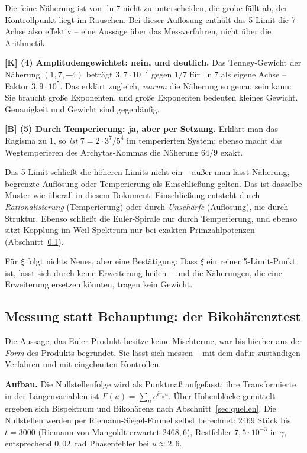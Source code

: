 Die feine N\"aherung ist von $\ln 7$ nicht zu unterscheiden, die grobe
f\"allt ab, der Kontrollpunkt liegt im Rauschen. Bei dieser Aufl\"osung
enth\"alt das 5-Limit die 7-Achse also effektiv -- eine Aussage \"uber
das Messverfahren, nicht \"uber die Arithmetik.

\textbf{[K] (4) Amplitudengewichtet: nein, und deutlich.} Das
Tenney-Gewicht der N\"aherung $(1,7,-4)$ betr\"agt
$3{,}7\cdot10^{-7}$ gegen $1/7$ f\"ur $\ln 7$ als eigene Achse --
Faktor $3{,}9\cdot10^{5}$. Das erkl\"art zugleich, \emph{warum} die
N\"aherung so genau sein kann: Sie braucht gro\ss e Exponenten, und
gro\ss e Exponenten bedeuten kleines Gewicht. Genauigkeit und Gewicht
sind gegenl\"aufig.

\textbf{[B] (5) Durch Temperierung: ja, aber per Setzung.} Erkl\"art
man das Ragisma zu $1$, so \emph{ist} $7 = 2\cdot 3^7/5^4$ im
temperierten System; ebenso macht das Wegtemperieren des
Archytas-Kommas die N\"aherung $64/9$ exakt.

\begin{keyresult}
Das 5-Limit schlie\ss t die h\"oheren Limits nicht ein -- au\ss er man
l\"asst N\"aherung, begrenzte Aufl\"osung oder Temperierung als
Einschlie\ss ung gelten. Das ist dasselbe Muster wie \"uberall in
diesem Dokument: Einschlie\ss ung entsteht durch \emph{Rationalisierung}
(Temperierung) oder durch \emph{Unsch\"arfe} (Aufl\"osung), nie durch
Struktur. Ebenso schlie\ss t die Euler-Spirale nur durch Temperierung,
und ebenso sitzt Kopplung im Weil-Spektrum nur bei exakten
Primzahlpotenzen (Abschnitt~\ref{sec:bikoh}).
\end{keyresult}

F\"ur $\xi$ folgt nichts Neues, aber eine Best\"atigung: Dass $\xi$ ein
reiner 5-Limit-Punkt ist, l\"asst sich durch keine Erweiterung heilen --
und die N\"aherungen, die eine Erweiterung ersetzen k\"onnten, tragen
kein Gewicht.

\subsection{Messung statt Behauptung: der Bikoh\"arenztest}
\label{sec:bikoh}

Die Aussage, das Euler-Produkt besitze keine Mischterme, war bis hierher
aus der \emph{Form} des Produkts begr\"undet. Sie l\"asst sich messen --
mit dem daf\"ur zust\"andigen Verfahren und mit eingebauten Kontrollen.

\textbf{Aufbau.} Die Nullstellenfolge wird als Punktma\ss{} aufgefasst;
ihre Transformierte in der L\"angenvariablen ist
$F(u) = \sum_n e^{i\gamma_n u}$. \"Uber H\"ohenbl\"ocke gemittelt
ergeben sich Bispektrum und Bikoh\"arenz nach
Abschnitt~\ref{sec:quellen}. Die Nullstellen werden per
Riemann-Siegel-Formel selbst berechnet: 2469 St\"uck bis $t = 3000$
(Riemann-von Mangoldt erwartet $2468{,}6$), Restfehler
$7{,}5\cdot10^{-3}$ in $\gamma$, entsprechend $0{,}02$~rad
Phasenfehler bei $u \approx 2{,}6$.

